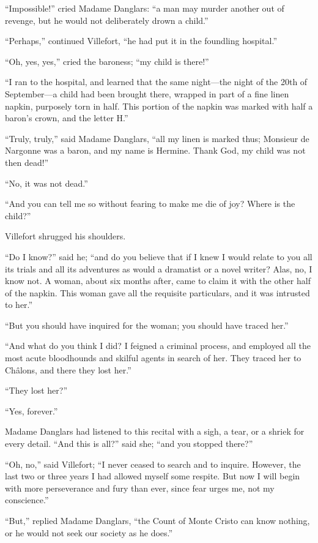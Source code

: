 “Impossible!” cried Madame Danglars: “a man may murder another out of
revenge, but he would not deliberately drown a child.”

“Perhaps,” continued Villefort, “he had put it in the foundling
hospital.”

“Oh, yes, yes,” cried the baroness; “my child is there!”

“I ran to the hospital, and learned that the same night—the night of
the 20th of September—a child had been brought there, wrapped in part
of a fine linen napkin, purposely torn in half. This portion of the
napkin was marked with half a baron’s crown, and the letter H.”

“Truly, truly,” said Madame Danglars, “all my linen is marked thus;
Monsieur de Nargonne was a baron, and my name is Hermine. Thank God, my
child was not then dead!”

“No, it was not dead.”

“And you can tell me so without fearing to make me die of joy? Where is
the child?”

Villefort shrugged his shoulders.

“Do I know?” said he; “and do you believe that if I knew I would relate
to you all its trials and all its adventures as would a dramatist or a
novel writer? Alas, no, I know not. A woman, about six months after,
came to claim it with the other half of the napkin. This woman gave all
the requisite particulars, and it was intrusted to her.”

“But you should have inquired for the woman; you should have traced
her.”

“And what do you think I did? I feigned a criminal process, and
employed all the most acute bloodhounds and skilful agents in search of
her. They traced her to Châlons, and there they lost her.”

“They lost her?”

“Yes, forever.”

Madame Danglars had listened to this recital with a sigh, a tear, or a
shriek for every detail. “And this is all?” said she; “and you stopped
there?”

“Oh, no,” said Villefort; “I never ceased to search and to inquire.
However, the last two or three years I had allowed myself some respite.
But now I will begin with more perseverance and fury than ever, since
fear urges me, not my conscience.”

“But,” replied Madame Danglars, “the Count of Monte Cristo can know
nothing, or he would not seek our society as he does.”

